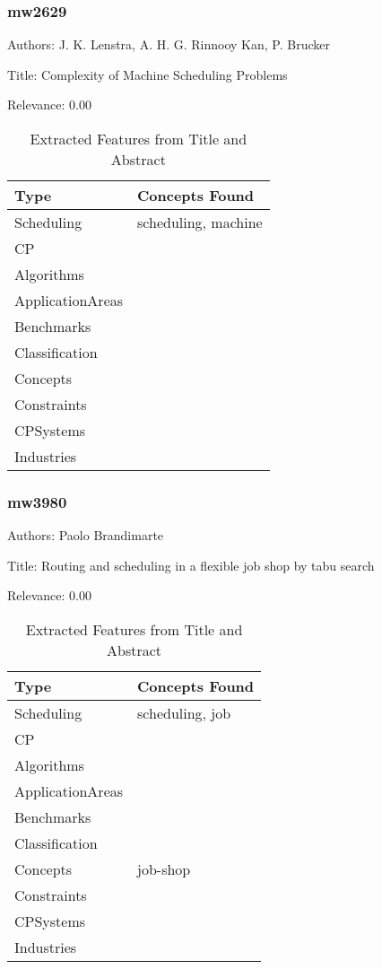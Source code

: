 \subsubsection{mw2629}
\label{mw:mw2629}

Authors: J. K. Lenstra, A. H. G. Rinnooy Kan, P. Brucker

Title: Complexity of Machine Scheduling Problems

Relevance:  0.00

{\scriptsize
\begin{longtable}{p{2cm}p{20cm}}
\caption{Extracted Features from Title and Abstract}\\ \toprule
Type & Concepts Found\\ \midrule
\endhead
\bottomrule
\endfoot
Scheduling & scheduling, machine\\ 
CP & \\ 
Algorithms & \\ 
ApplicationAreas & \\ 
Benchmarks & \\ 
Classification & \\ 
Concepts & \\ 
Constraints & \\ 
CPSystems & \\ 
Industries & \\ 
\end{longtable}
}



\subsubsection{mw3980}
\label{mw:mw3980}

Authors: Paolo Brandimarte

Title: Routing and scheduling in a flexible job shop by tabu search

Relevance:  0.00

{\scriptsize
\begin{longtable}{p{2cm}p{20cm}}
\caption{Extracted Features from Title and Abstract}\\ \toprule
Type & Concepts Found\\ \midrule
\endhead
\bottomrule
\endfoot
Scheduling & scheduling, job\\ 
CP & \\ 
Algorithms & \\ 
ApplicationAreas & \\ 
Benchmarks & \\ 
Classification & \\ 
Concepts & job-shop\\ 
Constraints & \\ 
CPSystems & \\ 
Industries & \\ 
\end{longtable}
}




